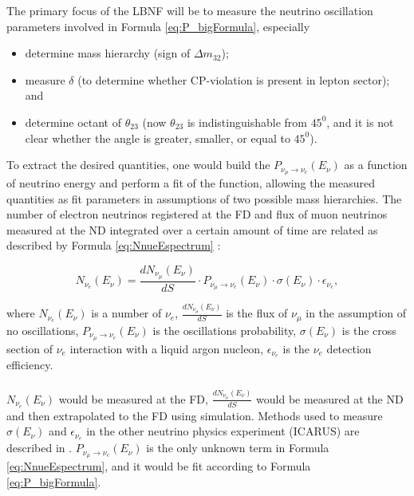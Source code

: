 The primary focus of the LBNF will be to measure the neutrino oscillation parameters involved in Formula \ref{eq:P_bigFormula}, especially 
\begin{itemize}
\item determine mass hierarchy (sign of $\Delta{m_{32}}$);
\item measure $\delta$ (to determine whether CP-violation is present in lepton sector); and
\item determine octant of $\theta_{23}$ (now $\theta_{23}$ is indistinguishable from $45^0$, and it is not clear whether the angle is greater, smaller, or equal to $45^0$).
\end{itemize}
To extract the desired quantities, one would build the $P_{\nu_\mu \rightarrow \nu_e}(E_{\nu})$ as a function of neutrino energy and perform a fit of the function, allowing the measured quantities as fit parameters in assumptions of two possible mass hierarchies. The number of electron neutrinos registered at the FD and flux of muon neutrinos measured at the ND integrated over a certain amount of time are related as described by Formula \ref{eq:NnueEspectrum} \cite{ref_Lisa}: \\ 
\begin{center}
\begin{equation}
\label{eq:NnueEspectrum}
N_{\nu_e}(E_{\nu}) = \frac{dN_{\nu_\mu}(E_{\nu})}{dS} \cdot P_{\nu_\mu \rightarrow \nu_e}(E_{\nu}) \cdot \sigma(E_{\nu}) \cdot \epsilon_{\nu_e}, 
\end{equation}
\end{center}
where $N_{\nu_e}(E_{\nu})$ is a number of $\nu_e$, $\frac{dN_{\nu_\mu}(E_{\nu})}{dS}$ is the flux of $\nu_\mu$ in the assumption of no oscillations, $P_{\nu_\mu \rightarrow \nu_e}(E_{\nu})$ is the oscillations probability, $\sigma(E_{\nu})$ is the cross section of $\nu_e$ interaction with a liquid argon nucleon, $\epsilon_{\nu_e}$ is the $\nu_e$ detection efficiency.\\ \\
$N_{\nu_e}(E_{\nu})$ would be measured at the FD, $\frac{dN_{\nu_\mu}(E_{\nu})}{dS}$ would be measured at the ND and then extrapolated to the FD using simulation. Methods used to measure $\sigma(E_{\nu})$ and $\epsilon_{\nu_e}$ in the other neutrino physics experiment (ICARUS) are described in \cite{ref_eff_ICARUS}. $P_{\nu_\mu \rightarrow \nu_e}(E_{\nu})$ is the only unknown term in Formula \ref{eq:NnueEspectrum}, and it would be fit according to Formula \ref{eq:P_bigFormula}.\\ \\

